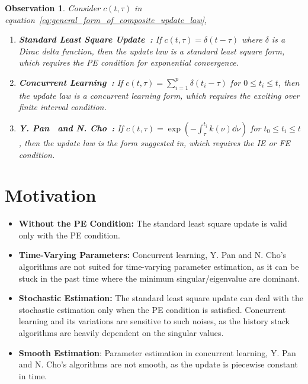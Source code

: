 \documentclass[nobib]{my-handout}
\newtheorem{observation}{Observation}
\begin{document}
\begin{observation}
	Consider $c(t, \tau)$ in
	equation~\eqref{eq:general_form_of_composite_update_law}, 
	\begin{enumerate}
		\item \textbf{Standard Least Square Update~\cite{slotine_applied_1991}:} If
			$c(t, \tau) = \delta(t-\tau)$ where $\delta$ is a Dirac delta function,
			then the update law is a standard least square form, which requires the
			PE condition for exponential convergence.
		\item \textbf{Concurrent Learning~\cite{chowdhary_exponential_2014}:} If
			$c(t, \tau) = \sum_{i=1}^p \delta(t_i - \tau)$ for $0 \le t_i \le t$,
			then the update law is a concurrent learning form, which requires the
			exciting over finite interval condition.
		\item \textbf{Y. Pan~\cite{pan_composite_2018} and N.
			Cho~\cite{cho_composite_2018}:} If $c(t, \tau) = \exp(- \int_\tau^{t_i}
			k(\nu) \dd{\nu})$ for $t_0 \le t_i \le t$, then the update law is the
			form suggested in, which requires the IE or FE condition.
	\end{enumerate}
\end{observation}


\section{Motivation}

\begin{itemize}
	\item \textbf{Without the PE Condition:} The standard least square update is
		valid only with the PE condition.
	\item \textbf{Time-Varying Parameters:} Concurrent learning, Y. Pan and N.
		Cho's algorithms are not suited for time-varying parameter estimation, as
		it can be stuck in the past time where the minimum singular/eigenvalue are
		dominant.
	\item \textbf{Stochastic Estimation:} The standard least square update can
		deal with the stochastic estimation only when the PE condition is satisfied. Concurrent learning and
		its variations are sensitive to such noises, as the history stack
		algorithms are heavily dependent on the singular values.
	\item \textbf{Smooth Estimation}: Parameter estimation in concurrent
		learning, Y. Pan and N. Cho's algorithms are not smooth, as the update is
		piecewise constant in time.
\end{itemize}
\end{document}
